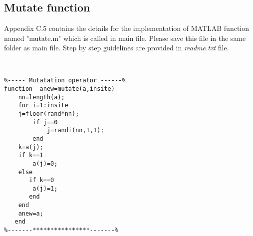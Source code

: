 \newpage
\subsection{Mutate function}
Appendix C.5 contains the details for the implementation of MATLAB function named "mutate.m" which is called in main file. Please save this file in the same folder as main file. Step by step guidelines are provided in \textit{readme.txt} file.\par

\begin{linenumbers}
\begin{lstlisting}


%----- Mutatation operator ------%
function  anew=mutate(a,insite)
    nn=length(a);
    for i=1:insite
    j=floor(rand*nn);
        if j==0
            j=randi(nn,1,1);
        end
    k=a(j);
    if k==1
        a(j)=0;
    else
       if k==0
        a(j)=1;
       end
    end
    anew=a;
   end
%-------****************-------%
\end{lstlisting}
\end{linenumbers} 